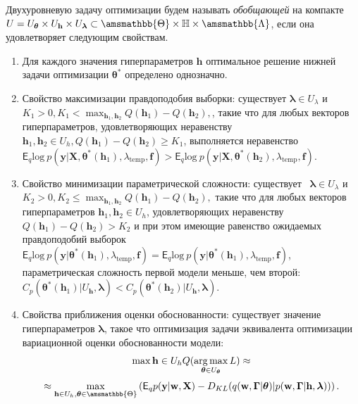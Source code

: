 \begin{defin}
Двухуровневую задачу оптимизации будем называть \textit{обобщающей} на компакте $U = U_{\boldsymbol{\theta}} \times U_{\mathbf{h}} \times U_{\boldsymbol{\lambda}} \subset \amsmathbb{\Theta} \times \mathbb{H} \times \amsmathbb{\Lambda}$, если она удовлетворяет следующим свойствам.
\begin{enumerate}
\item Для каждого значения гиперпараметров $\mathbf{h}$ оптимальное решение нижней задачи оптимизации $\boldsymbol{\theta}^{*}$ определено однозначно.

\item Свойство максимизации правдоподобия выборки: существует $\boldsymbol{\lambda} \in U_{\lambda}$ и  $K_1>0, K_1 < \max_{\mathbf{h}_1, \mathbf{h}_2} Q(\mathbf{h}_1) - Q(\mathbf{h}_2),$, такие что для любых векторов гиперпараметров, удовлетворяющих неравенству $\mathbf{h}_1, \mathbf{h}_2 \in U_{h}, Q(\mathbf{h}_1)-Q(\mathbf{h}_2) \geq K_1$, выполняется неравенство $\mathsf{E}_q \text{log}~p(\mathbf{y}|\mathbf{X}, \boldsymbol{\theta}^{*}(\mathbf{h}_1), \lambda_{\text{temp}}, \mathbf{f})>\mathsf{E}_q \text{log}~p(\mathbf{y}|\mathbf{X}, \boldsymbol{\theta}^{*}(\mathbf{h}_2), \lambda_{\text{temp}}, \mathbf{f})$.

\item Свойство минимизации параметрической сложности:  существует  $\boldsymbol{\lambda} \in U_{\lambda}$ и $K_2>0,$$K_2 \leq \max_{\mathbf{h}_1, \mathbf{h}_2} Q(\mathbf{h}_1) - Q(\mathbf{h}_2),$  такие что для любых векторов гиперпараметров $\mathbf{h}_1, \mathbf{h}_2 \in U_h$, удовлетворяющих неравенству $Q(\mathbf{h}_1)-Q(\mathbf{h}_2) > K_2$ и при этом имеющие равенство ожидаемых правдоподобий выборок  $\mathsf{E}_q \text{log}~p(\mathbf{y}|\boldsymbol{\theta}^{*}(\mathbf{h}_1), \lambda_{\text{temp}}, \mathbf{f}) = \mathsf{E}_q \text{log}~p(\mathbf{y}|\boldsymbol{\theta}^{*}(\mathbf{h}_1), \lambda_{\text{temp}}, \mathbf{f})$, параметрическая сложность первой модели меньше, чем второй: $C_p(\boldsymbol{\theta}^{*}(\mathbf{h}_1)|U_\mathbf{h},\boldsymbol{\lambda})<C_p(\boldsymbol{\theta}^{*}(\mathbf{h}_2)|U_\mathbf{h},\boldsymbol{\lambda})$.

\item Свойства приближения оценки обоснованности: существует значение гиперпараметров $\boldsymbol{\lambda}$, такое что оптимизация задачи эквивалента оптимизации вариационной оценки обоснованности модели: $$\max{\mathbf{h} \in U_h}Q(\operatorname*{arg\,max}_{\boldsymbol{\theta} \in U_{\boldsymbol{\theta}}} L) \approx $$
\[
 \approx \max_{\mathbf{h} \in U_h, \boldsymbol{\theta} \in \amsmathbb{\Theta}} \left(\mathsf{E}_q p(\mathbf{y}|\mathbf{w}, \mathbf{X})-{D}_{KL}(q(\mathbf{w}, \boldsymbol{\Gamma}|\boldsymbol{\theta})|p(\mathbf{w}, \boldsymbol{\Gamma}|\mathbf{h}, \boldsymbol{\lambda}))\right).
\]


\end{enumerate}
\end{defin}
